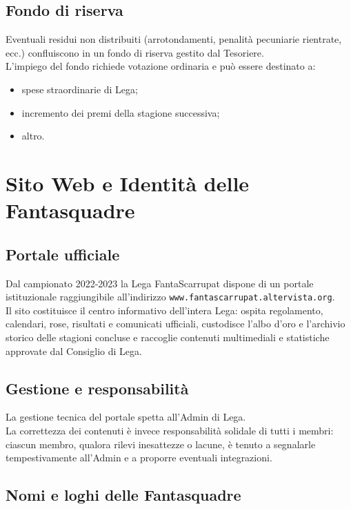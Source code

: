 \section{Fondo di riserva}
\label{art:10.5}

Eventuali residui non distribuiti (arrotondamenti, penalità pecuniarie rientrate, ecc.) confluiscono in un fondo di riserva gestito dal Tesoriere.\\
L'impiego del fondo richiede votazione ordinaria e può essere destinato a:
\begin{itemize}
    \item spese straordinarie di Lega;
    \item incremento dei premi della stagione successiva;
    \item altro.
\end{itemize}



\chapter{Sito Web e Identità delle Fantasquadre}
\label{cap:sito-identita}

\section{Portale ufficiale}
\label{art:11.1}

Dal campionato 2022-2023 la Lega FantaScarrupat dispone di un portale istituzionale raggiungibile all'indirizzo \texttt{www.fantascarrupat.altervista.org}.\\
Il sito costituisce il centro informativo dell'intera Lega: ospita regolamento, calendari, rose, risultati e comunicati ufficiali, custodisce l'albo d'oro e l'archivio storico delle stagioni concluse e raccoglie contenuti multimediali e statistiche approvate dal Consiglio di Lega.

\section{Gestione e responsabilità}
\label{art:11.2}

La gestione tecnica del portale spetta all'Admin di Lega.\\
La correttezza dei contenuti è invece responsabilità solidale di tutti i membri: ciascun membro, qualora rilevi inesattezze o lacune, è tenuto a segnalarle tempestivamente all'Admin e a proporre eventuali integrazioni.

\section{Nomi e loghi delle Fantasquadre}
\label{art:11.3}

